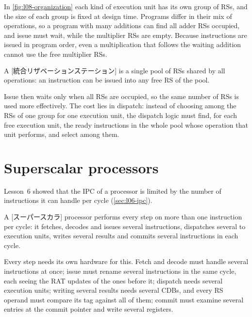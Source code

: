 \documentclass[../main.tex]{subfiles}
\begin{document}
In \cref{fig:l08-organization} each kind of execution unit has its own group of
RSs, and the size of each group is fixed at design time.  Programs differ in their mix of operations, so a
program with many additions can find all adder RSs occupied, and issue must
wait, while the multiplier RSs are empty.  Because instructions are issued in
program order, even a multiplication that follows the waiting addition cannot
use the free multiplier RSs.

\begin{definition}
  \label{def:l08-unified}
  A [統合リザベーションステーション] is a
  single pool of RSs shared by all operations: an instruction can be issued
  into any free RS of the pool.
\end{definition}

Issue then waits only when all RSs are occupied, so the same number of RSs is
used more effectively.  The cost lies in dispatch: instead of
choosing among
the RSs of one group for one execution unit, the dispatch logic must find, for
each free execution unit, the ready instructions in the whole pool whose
operation that unit performs, and select among them.

\section{Superscalar processors}
\label{sec:l08-superscalar}

Lesson~6 showed that the IPC of a processor is limited by the number of
instructions it can handle per cycle (\cref{sec:l06-ipc}).

\begin{definition}
  \label{def:l08-superscalar}
  A [スーパースカラ] processor performs every step on more
  than one instruction per cycle: it fetches, decodes and issues several
  instructions, dispatches several to execution units, writes several results
  and commits several instructions in each cycle.
\end{definition}

Every step needs its own hardware for this.  Fetch and decode must handle
several instructions at once; issue must rename several instructions in the
same cycle, each seeing the RAT updates of the ones before it; dispatch needs
several execution units; writing several results needs several CDBs, and
every RS operand must compare its tag against all of them; commit must
examine several entries at the commit pointer and write several registers.
\end{document}
